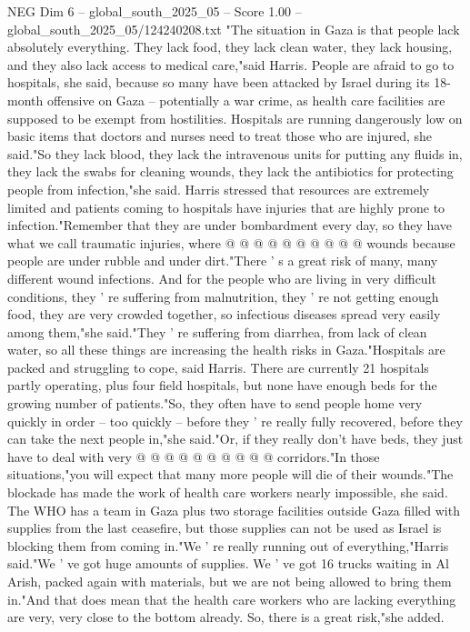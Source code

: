 \begin{textsample}{NEG Dim 6 – global\_south\_2025\_05 – Score 1.00 – global\_south\_2025\_05/124240208.txt}  \label{ex:f6_neg_390}
"The situation in Gaza is that people lack absolutely everything.
They lack food, they lack clean water, they lack housing, and they also lack access to medical care,"said Harris.
People are afraid to go to hospitals, she said, because so many have been attacked by Israel during its 18-month offensive on Gaza -- potentially a war crime, as health care facilities are supposed to be exempt from hostilities.
Hospitals are running dangerously low on basic items that doctors and nurses need to treat those who are injured, she said."So they lack blood, they lack the intravenous units for putting any fluids in, they lack the swabs for cleaning wounds, they lack the antibiotics for protecting people from infection,"she said.
Harris stressed that resources are extremely limited and patients coming to hospitals have injuries that are highly prone to infection."Remember that they are under bombardment every day, so they have what we call traumatic injuries, where @ @ @ @ @ @ @ @ @ @ wounds because people are under rubble and under dirt."There ' s a great risk of many, many different wound infections.
And for the people who are living in very difficult conditions, they ' re suffering from malnutrition, they ' re not getting enough food, they are very crowded together, so infectious diseases spread very easily among them,"she said."They ' re suffering from diarrhea, from lack of clean water, so all these things are increasing the health risks in Gaza."Hospitals are packed and struggling to cope, said Harris.
There are currently 21 hospitals partly operating, plus four field hospitals, but none have enough beds for the growing number of patients."So, they often have to send people home very quickly in order -- too quickly -- before they ' re really fully recovered, before they can take the next people in,"she said."Or, if they really don't have beds, they just have to deal with very @ @ @ @ @ @ @ @ @ @ corridors."In those situations,"you will expect that many more people will die of their wounds."The blockade has made the work of health care workers nearly impossible, she said.
The WHO has a team in Gaza plus two storage facilities outside Gaza filled with supplies from the last ceasefire, but those supplies can not be used as Israel is blocking them from coming in."We ' re really running out of everything,"Harris said."We ' ve got huge amounts of supplies.
We ' ve got 16 trucks waiting in Al Arish, packed again with materials, but we are not being allowed to bring them in."And that does mean that the health care workers who are lacking everything are very, very close to the bottom already.
So, there is a great risk,"she added.

\end{textsample}
